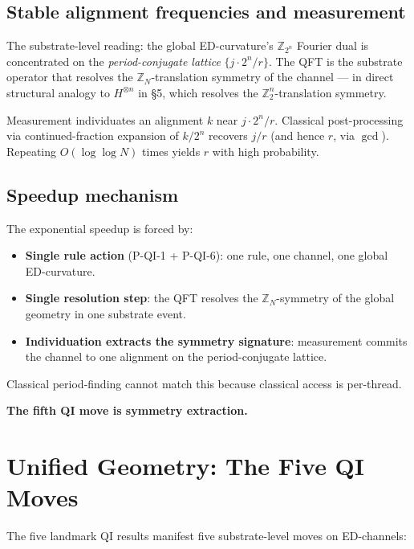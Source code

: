 \documentclass[11pt,a4paper]{article}
\begin{document}
\subsection{Stable alignment frequencies and measurement}

The substrate-level reading: the global ED-curvature's $\mathbb{Z}_{2^n}$ Fourier dual is concentrated on the \emph{period-conjugate lattice} $\{j\cdot 2^n/r\}$. The QFT is the substrate operator that resolves the $\mathbb{Z}_N$-translation symmetry of the channel --- in direct structural analogy to $H^{\otimes n}$ in \S5, which resolves the $\mathbb{Z}_2^n$-translation symmetry.

Measurement individuates an alignment $k$ near $j\cdot 2^n/r$. Classical post-processing via continued-fraction expansion of $k/2^n$ recovers $j/r$ (and hence $r$, via $\gcd$). Repeating $O(\log\log N)$ times yields $r$ with high probability.

\subsection{Speedup mechanism}

The exponential speedup is forced by:

\begin{itemize}[noitemsep]
  \item \textbf{Single rule action} (P-QI-1 + P-QI-6): one rule, one channel, one global ED-curvature.
  \item \textbf{Single resolution step}: the QFT resolves the $\mathbb{Z}_N$-symmetry of the global geometry in one substrate event.
  \item \textbf{Individuation extracts the symmetry signature}: measurement commits the channel to one alignment on the period-conjugate lattice.
\end{itemize}

Classical period-finding cannot match this because classical access is per-thread.

\textbf{The fifth QI move is symmetry extraction.}

\section{Unified Geometry: The Five QI Moves}

The five landmark QI results manifest five substrate-level moves on ED-channels:
\end{document}
